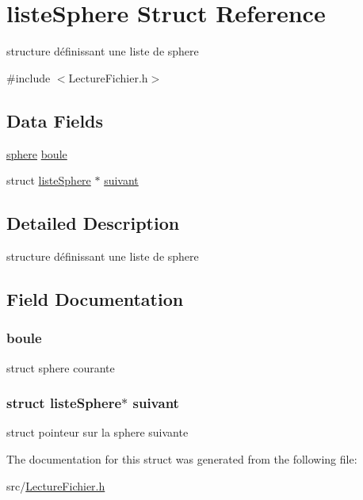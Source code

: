 \hypertarget{structliste_sphere}{
\section{listeSphere Struct Reference}
\label{structliste_sphere}
}


structure définissant une liste de sphere  




{\ttfamily \#include $<$LectureFichier.h$>$}

\subsection*{Data Fields}
\begin{DoxyCompactItemize}
\item 
\hyperlink{structsphere}{sphere} \hyperlink{structliste_sphere_a206841e3b403c55c53660243b6075e1c}{boule}
\item 
struct \hyperlink{structliste_sphere}{listeSphere} $\ast$ \hyperlink{structliste_sphere_aac8816bc4521483c85693ed3e73fd7e6}{suivant}
\end{DoxyCompactItemize}


\subsection{Detailed Description}
structure définissant une liste de sphere 

\subsection{Field Documentation}
\hypertarget{structliste_sphere_a206841e3b403c55c53660243b6075e1c}{
\subsubsection[{boule}]{ {\bf boule}}}
\label{structliste_sphere_a206841e3b403c55c53660243b6075e1c}
struct sphere courante \hypertarget{structliste_sphere_aac8816bc4521483c85693ed3e73fd7e6}{
\subsubsection[{suivant}]{\setlength{\rightskip}{0pt plus 5cm}struct {\bf listeSphere}$\ast$ {\bf suivant}}}
\label{structliste_sphere_aac8816bc4521483c85693ed3e73fd7e6}
struct pointeur sur la sphere suivante 

The documentation for this struct was generated from the following file:\begin{DoxyCompactItemize}
\item 
src/\hyperlink{_lecture_fichier_8h}{LectureFichier.h}\end{DoxyCompactItemize}
